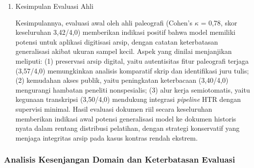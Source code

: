 \begin{enumerate}[leftmargin=1.5em, labelsep=0.5em, itemindent=0pt, label=\arabic*., topsep=0pt, partopsep=0pt]
\begin{enumerate}[leftmargin=1.5em, labelsep=0.5em, itemindent=0pt, noitemsep, topsep=0pt, label=\alph*)]
    \item Penilai 2 (ahli restorasi arsip): Dari perspektif arsip digital, keluaran model sangat sesuai untuk digitisasi massal dengan koreksi manual minimal. Reduksi derau latar pada mayoritas dokumen sangat membantu proses OCR/HTR selanjutnya. Apresiasi khusus untuk pendekatan konservatif pada dokumen memudar ekstrem; model tidak melakukan \textit{creative reconstruction} yang dapat menyesatkan interpretasi historis. Untuk alur kerja ANRI, disarankan penggunaan untuk praproses \textit{batch} dengan verifikasi ahli pada kasus kontras $<$30.

    \item \textit{Kesepakatan antarpenilai:} Ketidaksepakatan terbesar terjadi pada kriteria \textit{Minimasi Artefak} untuk dokumen kontras sedang; Penilai 1 lebih toleran terhadap derau residual dibanding Penilai 2 yang memprioritaskan kebersihan untuk otomasi OCR. Namun, kedua penilai sepakat pada urutan relatif dokumen (Spearman's $\rho$ = 0,91, p$<$0,001).
\end{enumerate}


    \item Kesimpulan Evaluasi Ahli
\label{subsubsubsec:kesimpulan-evaluasi-ahli}

Kesimpulannya, evaluasi awal oleh ahli paleografi (Cohen's $\kappa$ = 0,78, skor keseluruhan 3,42/4,0) memberikan indikasi positif bahwa model memiliki potensi untuk aplikasi digitisasi arsip, dengan catatan keterbatasan generalisasi akibat ukuran sampel kecil. Aspek yang dinilai menjanjikan meliputi: (1) preservasi arsip digital, yaitu autentisitas fitur paleografi terjaga (3,57/4,0) memungkinkan analisis komparatif skrip dan identifikasi juru tulis; (2) kemudahan akses publik, yaitu peningkatan keterbacaan (3,40/4,0) mengurangi hambatan peneliti nonspesialis; (3) alur kerja semiotomatis, yaitu kegunaan transkripsi (3,50/4,0) mendukung integrasi \textit{pipeline} HTR dengan supervisi minimal. Hasil evaluasi dokumen riil secara keseluruhan memberikan indikasi awal potensi generalisasi model ke dokumen historis nyata dalam rentang distribusi pelatihan, dengan strategi konservatif yang menjaga integritas arsip pada kasus kontras rendah ekstrem.
\end{enumerate}

\subsubsection{Analisis Kesenjangan Domain dan Keterbatasan Evaluasi}
\label{subsubsec:anri-domain-shift}

